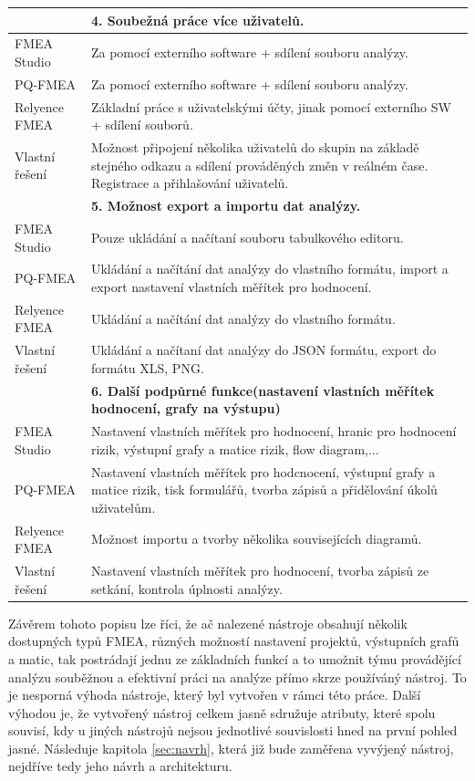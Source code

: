 \begin{longtable}{|p{4cm} | p{12cm} |}
& \textbf{4. Soubežná práce více uživatelů.} \\ \hline
 FMEA Studio &	Za pomocí externího software + sdílení souboru analýzy.  \\ 
 PQ-FMEA &	 Za pomocí externího software + sdílení souboru analýzy. \\ 
 Relyence FMEA &	  Základní práce s uživatelskými účty, jinak pomocí externího SW + sdílení souborů.  \\ 
Vlastní řešení &	 Možnost připojení několika uživatelů do skupin na základě stejného odkazu a sdílení prováděných změn v reálném čase. Registrace a přihlašování uživatelů. \\ \hline
& \textbf{5. Možnost export a importu dat analýzy. } \\ \hline
 FMEA Studio &	Pouze ukládání a načítaní souboru tabulkového editoru.  \\ 
 PQ-FMEA &	  Ukládání a načítání dat analýzy do vlastního formátu, import a export nastavení vlastních měřítek pro hodnocení.   \\ 
 Relyence FMEA &	 Ukládání a načítání dat analýzy do vlastního formátu.  \\ 
Vlastní řešení &	 Ukládání a načítaní dat analýzy do JSON formátu, export do formátu XLS, PNG.\\ \hline

& \textbf{6. Další podpůrné funkce(nastavení vlastních měřítek hodnocení, grafy na výstupu)} \\ \hline
 FMEA Studio &	Nastavení vlastních měřítek pro hodnocení, hranic pro hodnocení rizik, výstupní grafy a matice rizik, flow diagram,...  \\ 
 PQ-FMEA &	 Nastavení vlastních měřítek pro hodcnocení, výstupní grafy a matice rizik, tisk formulářů, tvorba zápisů a přidělování úkolů uživatelům.  \\ 
 Relyence FMEA &	  Možnost importu a tvorby několika souvisejících diagramů. \\ 
Vlastní řešení &	  Nastavení vlastních měřítek pro hodnocení, tvorba zápisů ze setkání, kontrola úplnosti analýzy. \\ \hline
\end{longtable}

Závěrem tohoto popisu lze říci, že ač nalezené nástroje obsahují několik dostupných typů FMEA, různých možností nastavení projektů, výstupních grafů a matic, tak postrádají jednu ze základních funkcí a to umožnit týmu provádějící analýzu souběžnou a efektivní práci na analýze přímo skrze používáný nástroj. To je nesporná výhoda nástroje, který byl vytvořen v rámci této práce. Další výhodou je, že vytvořený nástroj celkem jasně sdružuje atributy, které spolu souvisí, kdy u jiných nástrojů nejsou jednotlivé souvislosti hned na první pohled jasné. Následuje kapitola \ref{sec:navrh}, která již bude zaměřena vyvýjený nástroj, nejdříve tedy jeho návrh a architekturu. 
 